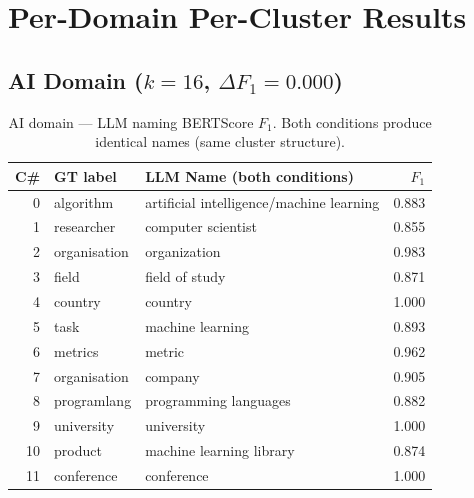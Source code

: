\documentclass[11pt,a4paper]{article}
\begin{document}
\FloatBarrier

\section{Per-Domain Per-Cluster Results}

\subsection{AI Domain ($k = 16$, $\Delta F_1 = 0.000$)}

\begin{table}[h]
\centering
\caption{AI domain --- LLM naming BERTScore $F_1$.
Both conditions produce identical names (same cluster structure).}
\label{tab:ai}
\small
\setlength{\tabcolsep}{4pt}
\begin{tabular}{r l l r}
\toprule
\textbf{C\#} & \textbf{GT label} & \textbf{LLM Name (both conditions)} & \textbf{$F_1$} \\
\midrule
0  & algorithm    & artificial intelligence/machine learning & \cellcolor{red!15}0.883 \\
1  & researcher   & computer scientist                       & \cellcolor{red!15}0.855 \\
2  & organisation & organization                             & \cellcolor{yellow!25}0.983 \\
3  & field        & field of study                           & \cellcolor{red!15}0.871 \\
4  & country      & country                                  & \cellcolor{green!15}1.000 \\
5  & task         & machine learning                         & \cellcolor{red!15}0.893 \\
6  & metrics      & metric                                   & \cellcolor{yellow!25}0.962 \\
7  & organisation & company                                  & \cellcolor{yellow!25}0.905 \\
8  & programlang  & programming languages                    & \cellcolor{red!15}0.882 \\
9  & university   & university                               & \cellcolor{green!15}1.000 \\
10 & product      & machine learning library                 & \cellcolor{red!15}0.874 \\
11 & conference   & conference                               & \cellcolor{green!15}1.000 \\

\end{tabular}
\end{table}
\end{document}
